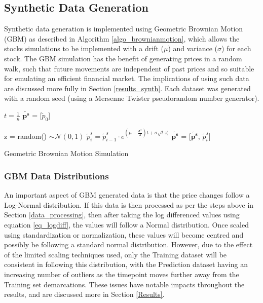 \documentclass[a4paper,11pt,oneside]{article}
\theoremstyle{plain}
\theoremstyle{definition}
\begin{document}
	\subsection{Synthetic Data Generation}\label{data_synthetic}
	
	Synthetic data generation is implemented using Geometric Brownian Motion (GBM) as described in Algorithm \ref{algo_brownianmotion}, which allows the stocks simulations to be implemented with a drift ($\mu$) and variance ($\sigma$) for each stock. The GBM simulation has the benefit of generating prices in a random walk, such that future movements are independent of past prices and so suitable for emulating an efficient financial market. The implications of using such data are discussed more fully in Section \ref{results_synth}. Each dataset was generated with a random seed (using a Mersenne Twister pseudorandom number generator). \newline
	
	\begin{algorithm}[H]
		
		$t = \frac{1}{n}$\;
		$\mathbf{\tilde{p^s}}$ = [$\tilde{p}_0$]\;
		
		{
			z = random()  $\sim \mathcal{N}(0,1)$\;
			$\tilde{p}^s_i = \tilde{p}^s_{i-1} \cdot e^{(\mu - \frac {\sigma^2}{2})t + \sigma  \sqrt{t}  z)}$\;
			$\mathbf{\tilde{p^s}}$ = [$\mathbf{\tilde{p^s}}$, $\tilde{p}^s_i$]\;
		}
		\label{algo_brownianmotion}
		\caption{Geometric Brownian Motion Simulation}
	\end{algorithm}
	
	\subsubsection{GBM Data Distributions}
	
	An important aspect of GBM generated data is that the price changes follow a Log-Normal distribution. If this data is then processed as per the steps above in Section \ref{data_processing}, then after taking the log differenced values using equation \eqref{eq_logdiff}, the values will follow a Normal distribution. Once scaled using standardization or normalization, these values will become centred and possibly be following a standard normal distribution. However, due to the effect of the limited scaling techniques used, only the Training dataset will be consistent in following this distribution, with the Prediction dataset having an increasing number of outliers as the timepoint moves further away from the Training set demarcations. These issues have notable impacts throughout the results, and are discussed more in Section \ref{Results}.
	
\end{document}
